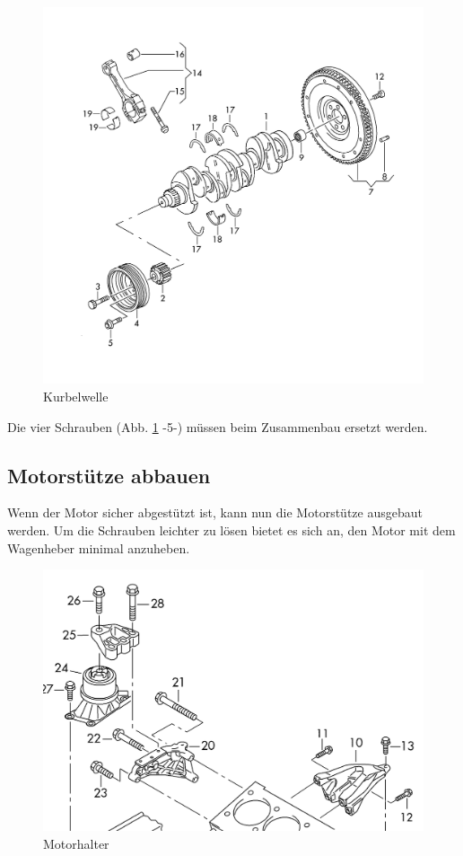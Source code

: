 \documentclass[twoside,a4paper]{refart}
\begin{document}
\begin{figure}[htb]
	\begin{center}
		\includegraphics[width=\textwidth]{Kurbelwelle}
		\caption{Kurbelwelle}
		\label{fig:kurbelwelle}
	\end{center}
\end{figure}
Die vier Schrauben (Abb. \ref{fig:kurbelwelle} -5-) müssen beim Zusammenbau ersetzt werden.

\newpage
\subsection{Motorstütze abbauen}
Wenn der Motor sicher abgestützt ist, kann nun die Motorstütze ausgebaut werden. Um die Schrauben leichter zu lösen bietet es sich an, den Motor mit dem Wagenheber minimal anzuheben.
\begin{figure}[htb]
	\begin{center}
		\includegraphics[width=\textwidth]{Motorhalter}
		\caption{Motorhalter}
		\label{fig:motorhalter}
	\end{center}
\end{figure}
\end{document}
